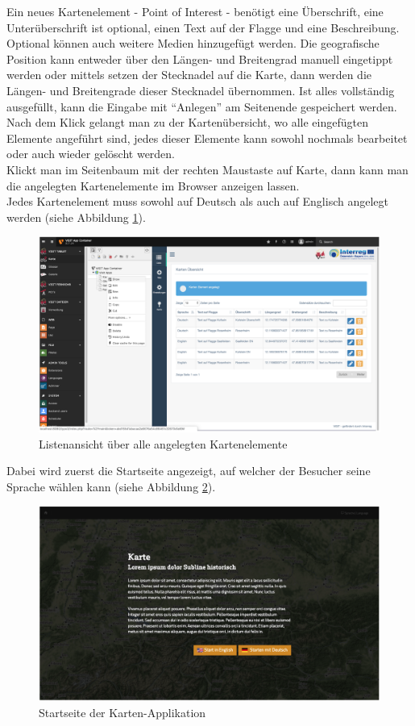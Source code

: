 Ein neues Kartenelement - Point of Interest - benötigt eine Überschrift, eine Unterüberschrift ist optional, einen Text auf der Flagge und eine Beschreibung. Optional können auch weitere Medien hinzugefügt werden. Die geografische Position kann entweder über den Längen- und Breitengrad manuell eingetippt werden oder mittels setzen der Stecknadel auf die Karte, dann werden die Längen- und Breitengrade dieser Stecknadel übernommen. Ist alles vollständig ausgefüllt, kann die Eingabe mit “Anlegen” am Seitenende gespeichert werden. Nach dem Klick gelangt man zu der Kartenübersicht, wo alle eingefügten Elemente angeführt sind, jedes dieser Elemente kann sowohl nochmals bearbeitet oder auch wieder gelöscht werden.\\
Klickt man im Seitenbaum mit der rechten Maustaste auf Karte, dann kann man die angelegten Kartenelemente im Browser anzeigen lassen.\\
Jedes Kartenelement muss sowohl auf Deutsch als auch auf Englisch angelegt werden (siehe Abbildung \ref{img:listenuebersicht_kartenelemente}).

\begin{figure}[ht!]
\centering
\includegraphics[width=12cm]{Figures/paula/karte/listenuebersicht_kartenelemente.png}
\caption{Listenansicht über alle angelegten Kartenelemente}
\label{img:listenuebersicht_kartenelemente}
\end{figure}

Dabei wird zuerst die Startseite angezeigt, auf welcher der Besucher seine Sprache wählen kann (siehe Abbildung \ref{img:startseite_kartenapp}).

\begin{figure}[ht!]
\centering
\includegraphics[width=12cm]{Figures/paula/karte/startseite_kartenapp.png}
\caption{Startseite der Karten-Applikation}
\label{img:startseite_kartenapp}
\end{figure}

